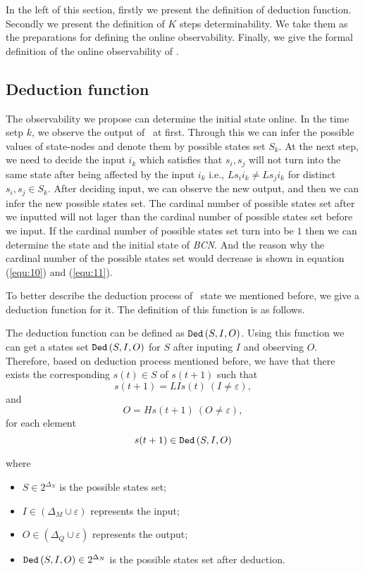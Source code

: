In the left of this section, firstly we present the definition of deduction function. Secondly we present the definition of $K$ steps determinability. We take them as the preparations for defining the online observability. Finally, we give the formal definition of the online observability of \BCNs. 
\subsection{Deduction function}
The observability we propose can determine the initial state online.
 In the time setp $k$, we observe the output of \BCNs\ at first. Through this we can infer the possible values of state-nodes and denote them by possible states set $S_k$. %
 At the next step, we need to decide the input $i_k$ which satisfies that %
$s_i, s_j$ 
 will not turn into the same state after being affected by the input $i_k$ i.e., $Ls_i i_k\neq Ls_j i_k$ for distinct $s_i, s_j\in S_k$. After deciding input, we can observe the new output, and then we can infer the new possible states set. The cardinal number of possible states set after we inputted will not lager than the cardinal number of possible states set before we input. If the cardinal number of possible states set turn into be $1$ then we can determine the state and the initial state of {\em BCN}. And the reason why the cardinal number of the possible states set would decrease is shown in equation (\ref{equ:10}) and (\ref{equ:11}). 
 
To better describe the deduction process of \BCN\ state we mentioned before, we give a deduction function for it. The definition of this function is as follows.
\begin{definition} The deduction function can be defined as ${\tt Ded}\left(S, I, O\right)$. Using this function we can get a states set ${\tt Ded}\left(S, I, O\right)$ for $S$ after inputing $I$ and observing $O$. Therefore, based on deduction process mentioned before, we have that there exists the corresponding $s(t)\in S$ of $s(t+1)$ such that \[s(t+1)=LIs(t)\ (I\neq \varepsilon), \] and \[O=Hs(t+1)\ (O\neq \varepsilon), \]
for each element \[s(t+1)\in {\tt Ded}\left(S, I, O\right)\]
\end{definition}
where   
\begin{itemize}
  \item $S\in 2^{\Delta_N}$ is the possible states set;
  \item $I\in (\Delta_M\cup\varepsilon)$ represents the input;
  \item $O\in(\Delta_Q\cup\varepsilon)$ represents the output; 
  \item ${\tt Ded}\left(S, I, O\right)\in 2^{\Delta_N}$ is the possible states set after deduction.
\end{itemize} 
 
